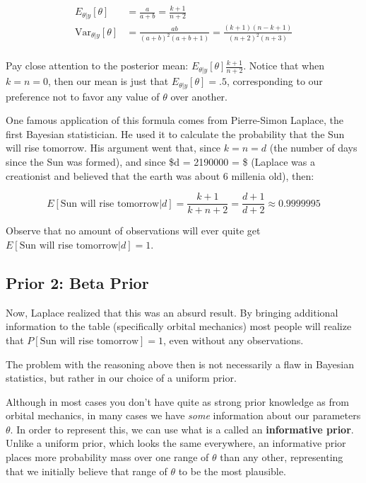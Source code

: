 \documentclass[
]{article}
\begin{document}
\[
\begin{split}
E_{\theta|y}[\theta] &= \frac{a}{a + b} = \frac{k+1}{n+2}\\
\text{Var}_{\theta|y}[\theta] &= \frac{a b}{(a + b)^2 (a+b+1)} = \frac{(k+1)(n-k+1)}{(n+2)^2(n+3)}\\
\end{split}
\]

Pay close attention to the posterior mean:
\(E_{\theta|y}[\theta] \frac{k+1}{n+2}\). Notice that when \(k=n=0\),
then our mean is just that \(E_{\theta|y}[\theta]=.5\), corresponding to
our preference not to favor any value of \(\theta\) over another.

One famous application of this formula comes from Pierre-Simon Laplace,
the first Bayesian statistician. He used it to calculate the probability
that the Sun will rise tomorrow. His argument went that, since \(k=n=d\)
(the number of days since the Sun was formed), and since \$d
    = 2190000 = \$
(Laplace was a creationist and believed that the earth was about 6
millenia old), then:

\[
E[\text{Sun will rise tomorrow}|d] = \frac{k+1}{k+n+2} =  \frac{d+1}{d+2} \approx 0.9999995
\]

Observe that no amount of observations will ever quite get
\(E[\text{Sun will rise tomorrow}|d] =1\).

\hypertarget{prior-2-beta-prior}{%
\subsection{Prior 2: Beta Prior}\label{prior-2-beta-prior}}

Now, Laplace realized that this was an absurd result. By bringing
additional information to the table (specifically orbital mechanics)
most people will realize that \(P[\text{Sun will rise tomorrow}]=1\),
even without any observations.

The problem with the reasoning above then is not necessarily a flaw in
Bayesian statistics, but rather in our choice of a uniform prior.

Although in most cases you don't have quite as strong prior knowledge as
from orbital mechanics, in many cases we have \emph{some} information
about our parameters \(\theta\). In order to represent this, we can use
what is a called an \textbf{informative prior}. Unlike a uniform prior,
which looks the same everywhere, an informative prior places more
probability mass over one range of \(\theta\) than any other,
representing that we initially believe that range of \(\theta\) to be
the most plausible.
\end{document}

